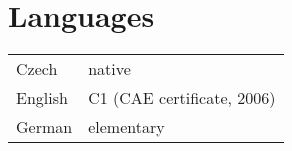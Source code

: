 \documentclass[a4paper, oneside, final]{scrartcl} %
\newcommand{\gray}{\rowcolor[gray]{.90}} %
\begin{document}



\section{Languages}
\begin{tabularx}{0.97\linewidth}{>{\raggedleft}p{2cm}X}
  Czech &  native \\
  English & C1 (CAE certificate, 2006) \\
  German & elementary \\ 
\end{tabularx}
\end{document}
